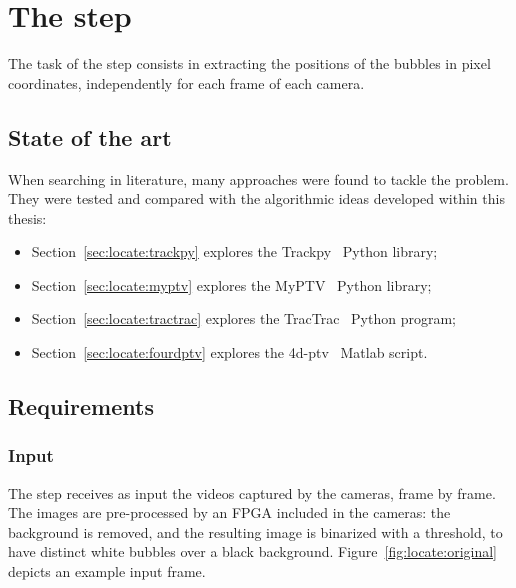 \chapter{The \locate* step}
\label{chap:locate}

\newcommand{\locateimgsize}{0.9\textwidth}

The task of the \locate* step consists in extracting the positions of the bubbles in pixel coordinates, independently for each frame of each camera.

\section{State of the art}

When searching in literature, many approaches were found to tackle the \locate* problem.
They were tested and compared with the algorithmic ideas developed within this thesis:
\begin{itemize}
	\itemsep 0em
	\item Section~\ref{sec:locate:trackpy} explores the Trackpy~\cite{trackpy} Python library;
	\item Section~\ref{sec:locate:myptv} explores the MyPTV~\cite{myptv} Python library;
	\item Section~\ref{sec:locate:tractrac} explores the TracTrac~\cite{tractrac} Python program;
	\item Section~\ref{sec:locate:fourdptv} explores the 4d-ptv~\cite{fourdptv} Matlab script.
\end{itemize}

\section{Requirements}

\subsection{Input}
The \locate* step receives as input the videos captured by the cameras, frame by frame.
The images are pre-processed by an FPGA included in the cameras: the background is removed, and the resulting image is binarized with a threshold, to have distinct white bubbles over a black background.
Figure~\ref{fig:locate:original} depicts an example input frame.


